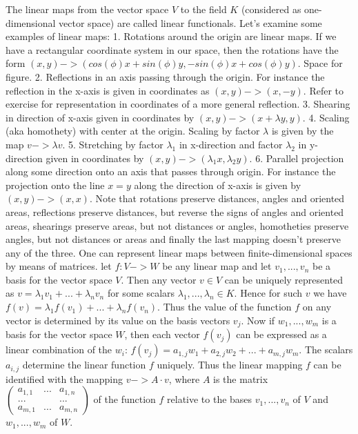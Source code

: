 The linear maps from the vector space $V$ to the field $K$ (considered as one-dimensional vector space) are called linear functionals.
Let's examine some examples of linear maps:
1. Rotations around the origin are linear maps. If we have a rectangular coordinate system in our space, then the rotations have the form $(x,y)->(cos(\phi) x + sin(\phi) y, -sin(\phi) x + cos(\phi) y)$.
Space for figure.
2. Reflections in an axis passing through the origin. For instance the reflection in the x-axis is given in coordinates as $(x,y)->(x,-y)$. Refer to exercise for representation in coordinates of a more general reflection.
3. Shearing in direction of x-axis given in coordinates by $(x,y)->(x+\lambda y,y)$.
4. Scaling (aka homothety) with center at the origin. Scaling by factor $\lambda$ is given by the map $v->\lambda v$.
5. Stretching by factor $\lambda_1$ in x-direction and factor $\lambda_2$ in y-direction given in coordinates by $(x,y)->(\lambda_1 x, \lambda_2 y)$.
6. Parallel projection along some direction onto an axis that passes through origin. For instance the projection onto the line $x=y$ along the direction of x-axis is given by $(x,y)->(x,x)$.
Note that rotations preserve distances, angles and oriented areas, reflections preserve distances, but reverse the signs of angles and oriented areas, shearings preserve areas, but not distances or angles, homotheties preserve angles, but not distances or areas and finally the last mapping doesn't preserve any of the three.
One can represent linear maps between finite-dimensional spaces by means of matrices. let $f:V->W$ be any linear map and let $v_1,...,v_n$ be a basis for the vector space $V$. Then any vector $v\in V$ can be uniquely represented as $v=\lambda_1 v_1 + ... + \lambda_n v_n$ for some scalars $\lambda_1,...,\lambda_n \in K$. Hence for such $v$ we have $f(v)=\lambda_1 f(v_1) + ... + \lambda _n f(v_n)$. Thus the value of the function $f$ on any vector is determined by its value on the basis vectors $v_j$. Now if $w_1,...,w_m$ is a basis for the vector space $W$, then each vector $f(v_j)$ can be expressed as a linear combination of the $w_i$: $f(v_j)=a_{1,j}w_1 + a_{2,j} w_2 + ... + a_{m,j}w_m$.
The scalars $a_{i,j}$ determine the linear function $f$ uniquely. Thus the linear mapping $f$ can be identified with the mapping $v->A\cdot v$, where $A$ is the matrix
$\begin{pmatrix}
a_{1,1} &... & a_{1,n} \\
... & & ... \\
a_{m,1} & ... & a_{m,n}
\end{pmatrix}$
of the function $f$ relative to the bases $v_1,...,v_n$ of $V$ and $w_1,...,w_m$ of $W$.

